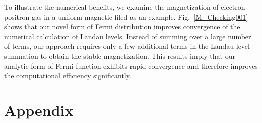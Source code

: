 \documentclass[sn-mathphys,Numbered]{sn-jnl}
\begin{document}
To illustrate the numerical benefits, we examine the magnetization of electron-positron gas in a uniform magnetic filed as an example. Fig.~\ref{M_Checking001} shows that our novel form of Fermi distribution improves convergence of the numerical calculation of Landau levels. Instead of summing over a large number of terms, our approach  requires only a few additional terms in the Landau level summation to obtain the stable magnetization. This results imply that our analytic form of Fermi function exhibits rapid convergence and therefore improves the computational efficiency significantly.






\section{Appendix}
\label{Append}
\end{document}
